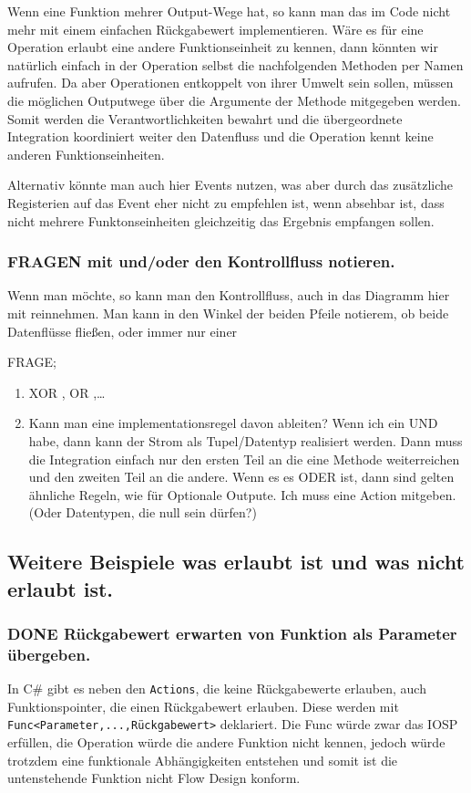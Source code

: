 \documentclass[11pt]{article}
\begin{document}
Wenn eine Funktion mehrer Output-Wege hat, so kann man das im Code nicht mehr mit einem einfachen Rückgabewert implementieren.
Wäre es für eine Operation erlaubt eine andere Funktionseinheit zu kennen, dann könnten wir natürlich einfach in der Operation selbst
die nachfolgenden Methoden per Namen aufrufen. Da aber Operationen entkoppelt von ihrer Umwelt sein sollen, müssen die möglichen
Outputwege über die Argumente der Methode mitgegeben werden. Somit werden die Verantwortlichkeiten bewahrt und die übergeordnete 
Integration koordiniert weiter den Datenfluss und die Operation kennt keine anderen Funktionseinheiten.

Alternativ könnte man auch hier Events nutzen, was aber durch das zusätzliche
Registerien auf das Event eher nicht zu empfehlen ist, wenn absehbar ist, dass
nicht mehrere Funktonseinheiten gleichzeitig das Ergebnis empfangen sollen.

\subsubsection{{\bfseries\sffamily FRAGEN} mit und/oder den Kontrollfluss notieren.}
\label{sec:orgheadline57}
Wenn man möchte, so kann man den Kontrollfluss, auch in das Diagramm hier mit
reinnehmen. Man kann in den Winkel der beiden Pfeile notierem, ob beide
Datenflüsse fließen, oder immer nur einer 

FRAGE; 
\begin{enumerate}
\item XOR , OR ,\ldots{}
\item Kann man eine implementationsregel davon ableiten?
Wenn ich ein UND habe, dann kann der Strom als Tupel/Datentyp realisiert
werden. Dann muss die Integration einfach nur den ersten Teil an die eine
Methode weiterreichen und den zweiten Teil an die andere.
Wenn es es ODER ist, dann sind gelten ähnliche Regeln, wie für Optionale
Outpute.
Ich muss eine Action mitgeben. (Oder Datentypen, die null sein dürfen?)
\end{enumerate}

\subsection{Weitere Beispiele was erlaubt ist und was nicht erlaubt ist.}
\label{sec:orgheadline61}
\subsubsection{{\bfseries\sffamily DONE} Rückgabewert erwarten von Funktion als Parameter übergeben.}
\label{sec:orgheadline59}
In C\# gibt es neben den \texttt{Actions}, die keine Rückgabewerte erlauben, auch Funktionspointer, die einen Rückgabewert erlauben. 
Diese werden mit \texttt{Func<Parameter,...,Rückgabewert>} deklariert.
Die Func würde zwar das IOSP erfüllen, die Operation würde die andere Funktion nicht kennen,
jedoch würde trotzdem eine funktionale Abhängigkeiten entstehen und somit ist die untenstehende Funktion nicht Flow Design konform.
\end{document}
